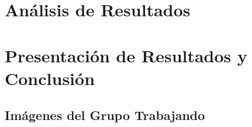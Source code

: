 \documentclass[stu,12pt]{apa7}
\begin{document}
\section{An\'alisis de Resultados}

\section{Presentaci\'on de Resultados y Conclusi\'on}

\begin{appendix}
\section{Im\'agenes del Grupo Trabajando}

\end{appendix}
\printbibliography
\end{document}
